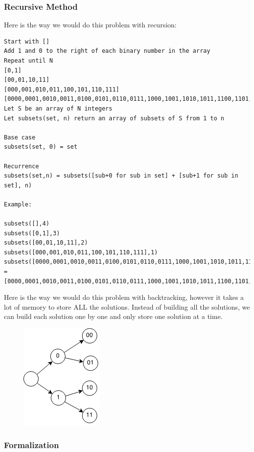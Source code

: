 \documentclass[11pt,oneside]{book}
\makeatletter
\def\maxwidth#1{\ifdim\Gin@nat@width>#1 #1\else\Gin@nat@width\fi}
\makeatother
\begin{document}
\subsubsection{Recursive Method}

Here is the way we would do this problem with recursion:

\begin{lstlisting}
Start with []
Add 1 and 0 to the right of each binary number in the array
Repeat until N
[0,1]
[00,01,10,11]
[000,001,010,011,100,101,110,111]
[0000,0001,0010,0011,0100,0101,0110,0111,1000,1001,1010,1011,1100,1101,1110,1111]
Let S be an array of N integers
Let subsets(set, n) return an array of subsets of S from 1 to n
 
Base case
subsets(set, 0) = set
 
Recurrence
subsets(set,n) = subsets([sub+0 for sub in set] + [sub+1 for sub in set], n)

Example:

subsets([],4)
subsets([0,1],3)
subsets([00,01,10,11],2)
subsets([000,001,010,011,100,101,110,111],1)
subsets([0000,0001,0010,0011,0100,0101,0110,0111,1000,1001,1010,1011,1100,1101,1110,1111],0)
=
[0000,0001,0010,0011,0100,0101,0110,0111,1000,1001,1010,1011,1100,1101,1110,1111]
\end{lstlisting}

Here is the way we would do this problem with backtracking, however it takes a lot of memory to store ALL the solutions. Instead of building all the solutions, we can build each solution one by one and only store one solution at a time.

\vspace{5px}\begin{figure}[H]\centering
        \includegraphics[width=0.66\maxwidth{\textwidth}]{enumerate-sets.png}
        \end{figure}

\subsubsection{Formalization}
\end{document}
